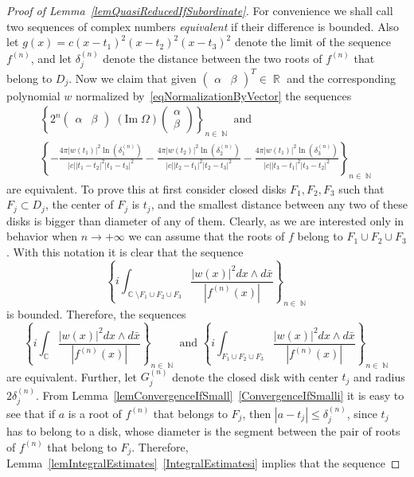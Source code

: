 \documentclass{amsart}
\numberwithin{equation}{section}
\theoremstyle{definition}
\theoremstyle{remark}
\DeclareMathOperator{\CC}{\mathbb C}
\DeclareMathOperator{\RR}{\mathbb R}
\DeclareMathOperator{\NN}{\mathbb N}
\begin{document}
\begin{proof}[Proof of Lemma~\ref{lemQuasiReducedIfSubordinate}]
		For convenience we shall call two sequences of complex numbers {\it{equivalent}} if their difference is bounded. Also let $g(x) = c(x-t_1)^2(x-t_2)^2(x-t_3)^2$ denote the limit of the sequence $f^{(n)}$, and let $\delta_j^{(n)}$ denote the distance between the two roots of $f^{(n)}$ that belong to $D_j$. Now we claim that given $\begin{pmatrix} \alpha & \beta \end{pmatrix}^T \in \RR$ and the corresponding polynomial $w$ normalized by~\eqref{eqNormalizationByVector} the sequences
		\begin{multline}\label{eqEquivalentSequences}
			\left\{2^n\begin{pmatrix}
				\alpha & \beta
			\end{pmatrix} \;(\mathrm{Im}\;\Omega) \begin{pmatrix}
				\alpha \\ \beta
			\end{pmatrix}\right\}_{n \in \NN} \text{ and }\\
			\left\{  -\frac{4\pi|w(t_1)|^2 \ln\left(\delta_1^{(n)}\right)}{|c||t_1 - t_2|^2 |t_1 - t_3|^2} - \frac{4\pi|w(t_2)|^2 \ln\left(\delta_2^{(n)}\right)}{|c||t_2 - t_1|^2 |t_2 - t_3|^2 } - \frac{4\pi|w(t_1)|^2 \ln\left(\delta_3^{(n)}\right)}{|c||t_3 - t_1|^2 |t_3 - t_2|^2}  \right\}_{n \in \NN}
		\end{multline}
		are equivalent. To prove this at first consider closed disks $F_1,F_2,F_3$ such that $F_j \subset D_j$, the center of $F_j$ is $t_j$, and the smallest distance between any two of these disks is bigger than diameter of any of them. Clearly, as we are interested only in behavior when $n \to +\infty$ we can assume that the roots of $f$ belong to $F_1 \cup F_2 \cup F_3$. With this notation it is clear that the sequence
		\[
		\left\{i\int_{\CC \setminus {F_1 \cup F_2 \cup F_3}}\frac{|w(x)|^2dx \wedge d\bar{x}}{|f^{(n)}(x)|}\right\}_{n \in \NN}
		\]
		is bounded. Therefore, the sequences
		\[
		\left\{i\int_{\CC}\frac{|w(x)|^2dx \wedge d\bar{x}}{|f^{(n)}(x)|}\right\}_{n \in \NN} \text{ and } \left\{i\int_{F_1 \cup F_2 \cup F_3}\frac{|w(x)|^2dx \wedge d\bar{x}}{|f^{(n)}(x)|}\right\}_{n \in \NN}
		\]
		are equivalent. Further, let $G^{(n)}_j$ denote the closed disk with center $t_j$ and radius $2\delta_j^{(n)}$. From Lemma~\ref{lemConvergenceIfSmall}~\ref{ConvergenceIfSmalli} it is easy to see that if $a$ is a root of $f^{(n)}$ that belongs to $F_j$, then $|a - t_j| \le \delta_j^{(n)}$, since $t_j$ has to belong to a disk, whose diameter is the segment between the pair of roots of $f^{(n)}$ that belong to $F_j$. Therefore, Lemma~\ref{lemIntegralEstimates}~\ref{IntegralEstimatesi} implies that the sequence

\end{proof}
\end{document}
